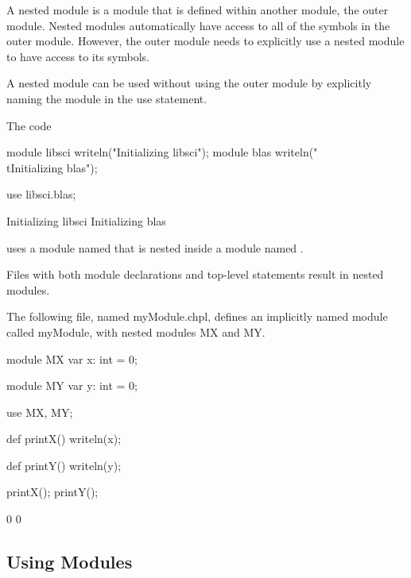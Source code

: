 A nested module is a module that is defined within another module, the
outer module.  Nested modules automatically have access to all of the
symbols in the outer module.  However, the outer module needs to
explicitly use a nested module to have access to its symbols.

A nested module can be used without using the outer module by
explicitly naming the module in the use statement.
\begin{example}
The code
\begin{chapelpre}
module libsci {
  writeln("Initializing libsci");
  module blas {
    writeln("\\tInitializing blas");
  }
}
\end{chapelpre}
\begin{chapel}
use libsci.blas;
\end{chapel}
\begin{chapeloutput}
Initializing libsci
	Initializing blas
\end{chapeloutput}
uses a module named  that is nested inside a module
named .
\end{example}

Files with both module declarations and top-level statements result in
nested modules.

\begin{example}
The following file, named myModule.chpl, defines an
implicitly named module called myModule, with nested modules
MX and MY.
\begin{chapelpre}
\end{chapelpre}
\begin{chapel}
module MX {
  var x: int = 0;
}

module MY {
  var y: int = 0;
}

use MX, MY;

def printX() {
  writeln(x);
}

def printY() {
  writeln(y);
}
\end{chapel}
\begin{chapelpost}
printX();
printY();
\end{chapelpost}
\begin{chapeloutput}
0
0
\end{chapeloutput}
\end{example}


\subsection{Using Modules}
\label{Using_Modules}

